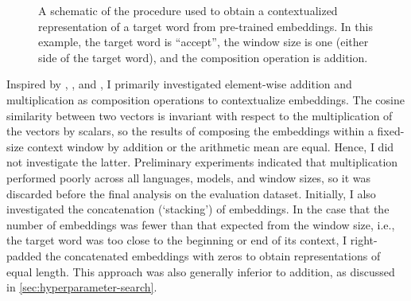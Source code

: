 \begin{figure}
  \centering
  \newcommand*{\orawidest}{accept}
  \newcommand*{\oratallest}{\#\#}
  \newlength{\orawidth}
  \settowidth{\orawidth}{\orawidest}
  \newcommand*{\ora}[1]{\overrightarrow{#1\vphantom{\oratallest}}}
  \caption{A schematic of the procedure used to
    obtain a contextualized representation of a target word from pre-trained embeddings.
    In this example, the target word is ``accept'', the window size is one (either side of
    the target word), and the composition operation is addition.
  }
  \label{chart:schematic-procedure}
\end{figure}

Inspired by \textcites{Landauer1997}, \textcites{Kintsch2001}, and
\textcites{Mitchell2008}, I primarily investigated element-wise addition and
multiplication as composition operations to contextualize embeddings.
The cosine similarity between two vectors is invariant with respect to the
multiplication of the vectors by scalars, so the results of composing the embeddings
within a fixed-size context window by addition or the arithmetic mean are equal.
Hence, I did not investigate the latter.
Preliminary experiments indicated that multiplication performed poorly across all
languages, models, and window sizes, so it was discarded before the final analysis on
the evaluation dataset.
Initially, I also investigated the concatenation (`stacking') of embeddings.
In the case that the number of embeddings was fewer than that expected from the window
size, i.e., the target word was too close to the beginning or end of its context, I
right-padded the concatenated embeddings with zeros to obtain representations of equal
length.
This approach was also generally inferior to addition, as discussed in
\cref{sec:hyperparameter-search}.

